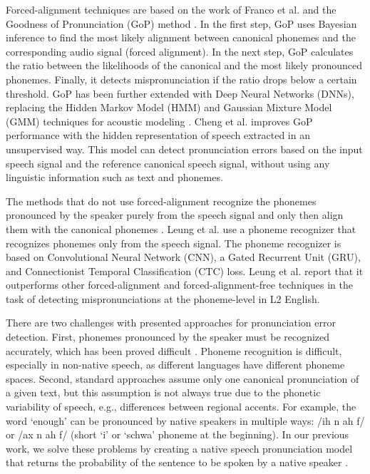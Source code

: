 \documentclass[]{interact}
\theoremstyle{plain}%
\theoremstyle{definition}
\theoremstyle{remark}
\begin{document}
Forced-alignment techniques \cite{Hongyan2011, li2016mispronunciation, sudhakara2019improved, cheng2020asr} are based on the work of Franco et al. \cite{franco1997automatic} and the Goodness of Pronunciation (GoP) method \cite{witt2000phone}. In the first step, GoP uses Bayesian inference to find the most likely alignment between canonical phonemes and the corresponding audio signal (forced alignment).  In the next step, GoP calculates the ratio between the likelihoods of the canonical and the most likely pronounced phonemes. Finally, it detects mispronunciation if the ratio drops below a certain threshold.  GoP has been further extended with Deep Neural Networks (DNNs), replacing the Hidden Markov Model (HMM) and Gaussian Mixture Model (GMM) techniques for acoustic modeling \cite{li2016mispronunciation,sudhakara2019improved}. Cheng et al. \cite{cheng2020asr} improves GoP performance with the hidden representation of speech extracted in an unsupervised way. This model can detect pronunciation errors based on the input speech signal and the reference canonical speech signal, without using any linguistic information such as text and phonemes. 

The methods that do not use forced-alignment recognize the phonemes pronounced by the speaker purely from the speech signal and only then align them with the canonical phonemes \cite{Minematsu2004PronunciationAB, harrison2009implementation, Lee2013PronunciationAV, plantinga2019towards,Sudhakara2019NoiseRG,zhang2020end}. Leung et al. \cite{leung2019cnn} use a phoneme recognizer that recognizes phonemes only from the speech signal. The phoneme recognizer is based on Convolutional Neural Network (CNN), a Gated Recurrent Unit (GRU), and Connectionist Temporal Classification (CTC) loss. Leung et al. report that it outperforms other forced-alignment \cite{li2016mispronunciation} and forced-alignment-free \cite{harrison2009implementation} techniques in the task of detecting mispronunciations at the phoneme-level in L2 English. 

There are two challenges with presented approaches for pronunciation error detection. First, phonemes pronounced by the speaker must be recognized accurately, which has been proved difficult \cite{zhang2021text, chorowski2014end, chorowski2015attention, bahdanau2016end}. Phoneme recognition is difficult, especially in non-native speech, as different languages have different phoneme spaces. Second, standard approaches assume only one canonical pronunciation of a given text, but this assumption is not always true due to the phonetic variability of speech, e.g., differences between regional accents. For example, the word `enough' can be pronounced by native speakers in multiple ways:  /ih n ah f/ or /ax n ah f/ (short `i' or `schwa' phoneme at the beginning). In our previous work, we solve these problems by creating a native speech pronunciation model that returns the probability of the sentence to be spoken by a native speaker \cite{korzekwa2021mispronunciation}.
\end{document}
